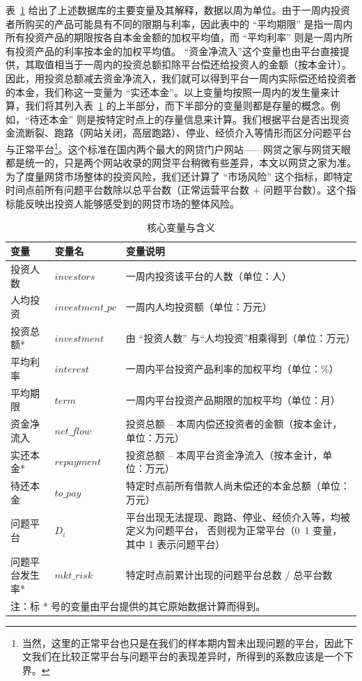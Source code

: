 \documentclass[lang=cn,11pt]{elegantpaper}
\begin{document}
表~\ref{tab:var} 给出了上述数据库的主要变量及其解释，数据以周为单位。由于一周内投资者所购买的产品可能具有不同的限期与利率，因此表中的 “平均期限” 是指一周内所有投资产品的期限按各自本金金额的加权平均值，而 “平均利率” 则是一周内所有投资产品的利率按本金的加权平均值。 “资金净流入”这个变量也由平台直接提供，其取值相当于一周内的投资总额扣除平台偿还给投资人的金额（按本金计）。因此，用投资总额减去资金净流入，我们就可以得到平台一周内实际偿还给投资者的本金，我们称这一变量为 “实还本金”。以上变量均按照一周内的发生量来计算，我们将其列入表~\ref{tab:var} 的上半部分，而下半部分的变量则都是存量的概念。例如，“待还本金” 则是按特定时点上的存量信息来计算。我们根据平台是否出现资金流断裂、跑路（网站关闭，高层跑路）、停业、经侦介入等情形而区分问题平台与正常平台\footnote{当然，这里的正常平台也只是在我们的样本期内暂未出现问题的平台，因此下文我们在比较正常平台与问题平台的表现差异时，所得到的系数应该是一个下界。}。这个标准在国内两个最大的网贷门户网站——网贷之家与网贷天眼都是统一的，只是两个网站收录的网贷平台稍微有些差异，本文以网贷之家为准。为了度量网贷市场整体的投资风险，我们还计算了 “市场风险” 这个指标，即特定时间点前所有问题平台数除以总平台数（正常运营平台数 $+$ 问题平台数）。这个指标能反映出投资人能够感受到的网贷市场的整体风险。

\begin{table}[htbp]
\centering
\caption{核心变量与含义\label{tab:var}}
\begin{tabular}{llp{10cm}}
\toprule
变量    & 变量名   & 变量说明 \\
\midrule
投资人数  & $investors$ & 一周内投资该平台的人数（单位：人） \\
人均投资  & $investment\_pc$ & 一周内人均投资额（单位：万元） \\
投资总额* & $investment$ & 由 “投资人数” 与“人均投资”相乘得到（单位：万元） \\
平均利率  & $interest$ & 一周内平台投资产品利率的加权平均（单位：\%） \\
平均期限  & $term$  & 一周内平台投资产品期限的加权平均（单位：月） \\
资金净流入 & $net\_flow$ & 投资总额 – 本周内偿还投资者的金额（按本金计，单位：万元） \\
实还本金* & $repayment$ & 投资总额 – 本周平台资金净流入（按本金计，单位：万元） \\
\midrule
待还本金  & $to\_pay$ & 特定时点前所有借款人尚未偿还的本金总额（单位：万元） \\
问题平台 & $D_i$ & 平台出现无法提现、跑路、停业、经侦介入等，均被定义为问题平台，
否则视为正常平台（0~1 变量，其中 1 表示问题平台） \\
问题平台发生率* & $mkt\_risk$ & 特定时点前累计出现的问题平台总数 / 总平台数 \\
\bottomrule
\multicolumn{3}{p{12cm}}{\scriptsize 注：标 * 号的变量由平台提供的其它原始数据计算而得到。}
\end{tabular}%
\end{table}%
\end{document}
